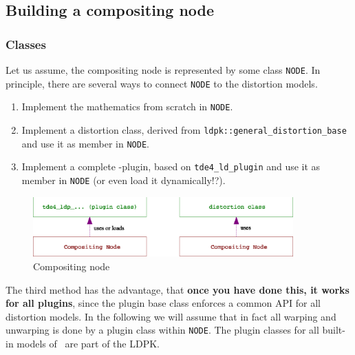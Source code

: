 \documentclass[10pt,a4paper]{article}
\begin{document}
\subsection{Building a compositing node}

\subsubsection{Classes}
Let us assume, the compositing node is represented by some class {\tt NODE}.
In principle, there are several ways to connect {\tt NODE} to the distortion models.
\begin{enumerate}
\item Implement the mathematics from scratch in {\tt NODE}.
\item Implement a distortion class, derived from {\tt ldpk::general\_distortion\_base}
and use it as member in {\tt NODE}.
\item Implement a complete \tde-plugin, based on {\tt tde4\_ld\_plugin}
and use it as member in {\tt NODE} (or even load it dynamically!?).
\end{enumerate}
\begin{figure}[ht]
\centering
\includegraphics[width=10cm]{compositing_node_classes.eps}
\caption{Compositing node}
\label{fig:CompositingNodeClasses}
\end{figure}
The third method has the advantage, that {\bf once you have done this, it works for all plugins},
since the plugin base class enforces a common API for all distortion models.
In the following we will assume that in fact all warping and unwarping is done by a plugin class within {\tt NODE}.
The plugin classes for all built-in models of \tde\ are part of the LDPK.
\end{document}
